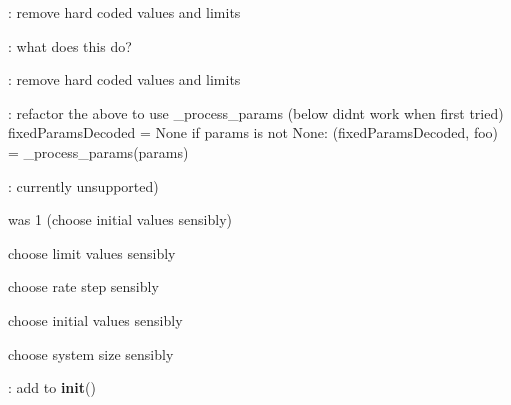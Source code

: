 
\begin{DoxyRefList}
\item[\label{todo__todo000002}%
\Hypertarget{todo__todo000002}%
Global \hyperlink{namespace_mu_mo_t_1_1_mu_mo_t_a7f7ea1e7e5688cb25a6651783db498e0}{Mu\+MoT\+:\+:Mu\+MoT.\+\_\+plot\+Limits\+Widget} ]\+: remove hard coded values and limits  
\item[\label{todo__todo000004}%
\Hypertarget{todo__todo000004}%
Global \hyperlink{namespace_mu_mo_t_1_1_mu_mo_t_aa92c55a994d799a87d6bc8e0b08372ba}{Mu\+MoT\+:\+:Mu\+MoT.\+\_\+pydstoolify} (self, equation)]\+: what does this do?  
\item[\label{todo__todo000003}%
\Hypertarget{todo__todo000003}%
Global \hyperlink{namespace_mu_mo_t_1_1_mu_mo_t_ab1e13c5ff312caa1398f9de296be2319}{Mu\+MoT\+:\+:Mu\+MoT.\+\_\+system\+Size\+Widget} ]\+: remove hard coded values and limits  
\item[\label{todo__todo000001}%
\Hypertarget{todo__todo000001}%
Global \hyperlink{namespace_mu_mo_t_1_1_mu_mo_t_a60d5947424f4fcd4ca9ed05e6dc43227}{Mu\+MoT\+:\+:Mu\+MoT.widget} ]\+: refactor the above to use \+\_\+process\+\_\+params (below didn\textquotesingle{}t work when first tried) fixed\+Params\+Decoded = None if params is not None\+: (fixed\+Params\+Decoded, foo) = \+\_\+process\+\_\+params(params)  
\item[\label{todo__todo000046}%
\Hypertarget{todo__todo000046}%
Global \hyperlink{class_mu_mo_t_1_1_mu_mo_t_1_1_mu_mo_tbifurcation_view_a17d5bd0e623faea6f50fc3b7f01d0d38}{Mu\+Mo\+Tbifurcation\+View.\+\_\+bifurcation\+Parameter} ]\+: currently unsupported)  
\item[\label{todo__todo000050}%
\Hypertarget{todo__todo000050}%
Global \hyperlink{class_mu_mo_t_1_1_mu_mo_t_1_1_mu_mo_tbifurcation_view_a6a353a1ef9443ae375948d592ed6cec6}{Mu\+Mo\+Tbifurcation\+View.\+\_\+choose\+Font\+Size} ]was 1 (choose initial values sensibly) 

choose limit values sensibly 

choose rate step sensibly 

choose initial values sensibly 

choose system size sensibly  
\item[\label{todo__todo000057}%
\Hypertarget{todo__todo000057}%
Global \hyperlink{class_mu_mo_t_1_1_mu_mo_t_1_1_mu_mo_tbifurcation_view_a797e92fe19ce2636a49bf1400a69fc49}{Mu\+Mo\+Tbifurcation\+View.\+\_\+py\+D\+Scont} ]\+: add to {\bfseries init}() 


\end{DoxyRefList}
